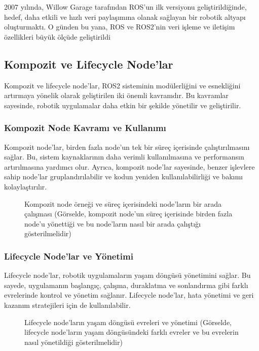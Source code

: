 2007 yılında, Willow Garage tarafından ROS'un ilk versiyonu geliştirildiğinde, hedef, daha etkili ve hızlı veri paylaşımına olanak sağlayan bir robotik altyapı oluşturmaktı. O günden bu yana, ROS ve ROS2'nin veri işleme ve iletişim özellikleri büyük ölçüde geliştirildi

\subsection{Kompozit ve Lifecycle Node'lar}
Kompozit ve lifecycle node'lar, ROS2 sisteminin modülerliğini ve esnekliğini artırmaya yönelik olarak geliştirilen iki önemli kavramdır. Bu kavramlar sayesinde, robotik uygulamalar daha etkin bir şekilde yönetilir ve geliştirilir.

\subsubsection{Kompozit Node Kavramı ve Kullanımı}
Kompozit node'lar, birden fazla node'un tek bir süreç içerisinde çalıştırılmasını sağlar. Bu, sistem kaynaklarının daha verimli kullanılmasına ve performansın artırılmasına yardımcı olur. Ayrıca, kompozit node'lar sayesinde, benzer işlevlere sahip node'lar gruplandırılabilir ve kodun yeniden kullanılabilirliği ve bakımı kolaylaştırılır.

\begin{figure}[h]
\centering
\caption{Kompozit node örneği ve süreç içerisindeki node'ların bir arada çalışması (Görselde, kompozit node'un süreç içerisinde birden fazla node'u yönettiği ve bu node'ların nasıl bir arada çalıştığı gösterilmelidir)}
\end{figure}

\subsubsection{Lifecycle Node'lar ve Yönetimi}
Lifecycle node'lar, robotik uygulamaların yaşam döngüsü yönetimini sağlar. Bu sayede, uygulamanın başlangıç, çalışma, duraklatma ve sonlandırma gibi farklı evrelerinde kontrol ve yönetim sağlanır. Lifecycle node'lar, hata yönetimi ve geri kazanım stratejileri için de kullanılabilir.

\begin{figure}[h]
\centering
\caption{Lifecycle node'ların yaşam döngüsü evreleri ve yönetimi (Görselde, lifecycle node'ların yaşam döngüsündeki farklı evreler ve bu evrelerin nasıl yönetildiği gösterilmelidir)}
\end{figure}

